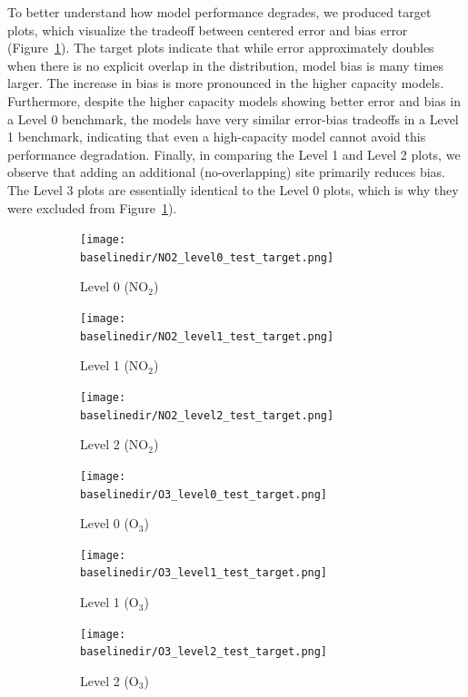 \documentclass[journal abbreviation, manuscript]{copernicus}
\newcommand{\textus}[1]{$_{\text{#1}}$}
\begin{document}
To better understand how model performance degrades, we produced target plots, which visualize the tradeoff between centered error and bias  error (Figure~\ref{fig:target-plots-levels}).  The target plots indicate that while error approximately doubles when there is no explicit overlap in the distribution, model bias is many times larger. The increase in bias is more pronounced in the higher capacity models. Furthermore, despite the higher capacity models showing better error and bias in a Level 0 benchmark, the models have very similar error-bias tradeoffs in a Level 1 benchmark, indicating that even a high-capacity model cannot avoid this performance degradation.  Finally, in comparing the Level 1 and Level 2 plots, we observe that adding an additional (no-overlapping) site primarily reduces bias.  The Level 3 plots are essentially identical to the Level 0 plots, which is why they were excluded from Figure~\ref{fig:target-plots-levels}).


\begin{figure}[H]
\centering
\begin{subfigure}{0.33\textwidth}
\texttt{[image: \\baselinedir/NO2\_level0\_test\_target.png]}
\caption{Level 0 (NO\textus{2})}
\end{subfigure}
\begin{subfigure}{0.33\textwidth}
\texttt{[image: \\baselinedir/NO2\_level1\_test\_target.png]}
\caption{Level 1 (NO\textus{2})}
\end{subfigure}
\begin{subfigure}{0.33\textwidth}
\texttt{[image: \\baselinedir/NO2\_level2\_test\_target.png]}
\caption{Level 2 (NO\textus{2})}
\end{subfigure}
\begin{subfigure}{0.33\textwidth}
\texttt{[image: \\baselinedir/O3\_level0\_test\_target.png]}
\caption{Level 0 (O\textus{3})}
\end{subfigure}
\begin{subfigure}{0.33\textwidth}
\texttt{[image: \\baselinedir/O3\_level1\_test\_target.png]}
\caption{Level 1 (O\textus{3})}
\end{subfigure}
\begin{subfigure}{0.33\textwidth}
\texttt{[image: \\baselinedir/O3\_level2\_test\_target.png]}
\caption{Level 2 (O\textus{3})}
\end{subfigure}
\caption{}
\label{fig:target-plots-levels}
\end{figure}
\end{document}
